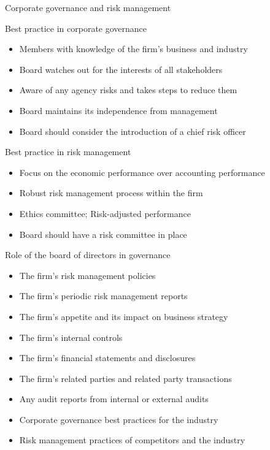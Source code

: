 \begin{frame}[allowframebreaks]{Corporate governance and risk management}
\begin{block}{Best practice in corporate governance}
	\begin{itemize}
		\item Members with knowledge of the
		firm's business and industry
		\item Board watches out for the interests of all stakeholders
		\item Aware of any agency risks and takes steps to reduce them 
		\item Board maintains its independence from management 
		\item Board should consider the introduction of a chief risk officer
	\end{itemize}
\end{block}

\begin{block}{Best practice in risk management}
	\begin{itemize}
		\item Focus on the economic performance over accounting performance
		\item Robust risk management process within the firm
		\item Ethics committee; Risk-adjusted performance
		\item Board should have a risk committee in place
	\end{itemize}
\end{block}

\begin{block}{Role of the board of directors in governance}
	\begin{itemize}
		\item The firm's risk management policies
		\item The firm's periodic risk management reports
		\item The firm's appetite and its impact on business strategy
		\item The firm's internal controls
		\item The firm's financial statements and disclosures
		\item The firm's related parties and related party transactions
		\item Any audit reports from internal or external audits
		\item Corporate governance best practices for the industry
		\item Risk management practices of competitors and the industry
	\end{itemize}
\end{block}


\end{frame}
